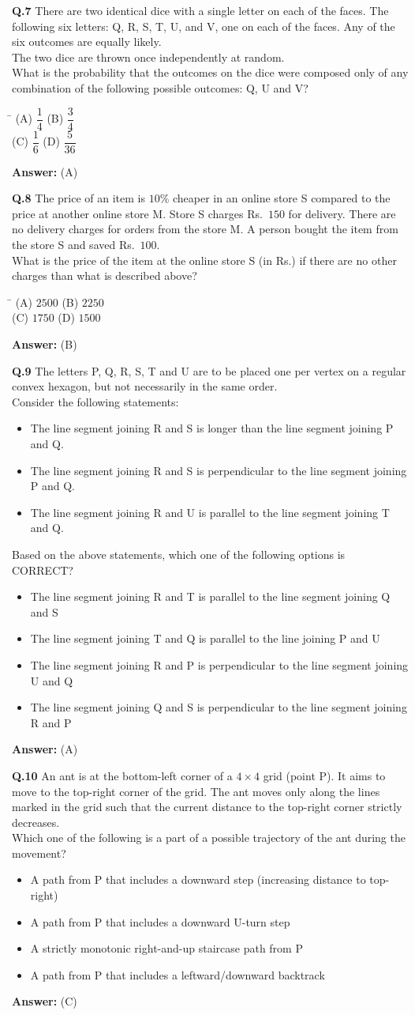 \documentclass[11pt,a4paper]{article}
\newcommand{\optsfourA}[4]{%
  \begin{tabbing}
    \hspace{0.48\linewidth}\=\kill
    (A) #1 \> (B) #2 \\[2pt]
    (C) #3 \> (D) #4
  \end{tabbing}%
}
\newcommand{\optslistA}[4]{%
  \begin{itemize}
    \setlength{\itemsep}{2pt}\setlength{\parskip}{0pt}
    \item[(A)] #1
    \item[(B)] #2
    \item[(C)] #3
    \item[(D)] #4
  \end{itemize}%
}
\newcommand{\ans}[1]{\textbf{Answer:} #1\par\medskip}
\begin{document}
\textbf{Q.7} There are two identical dice with a single letter on each of the faces. The following six letters: Q, R, S, T, U, and V, one on each of the faces. Any of the six outcomes are equally likely.\\
The two dice are thrown once independently at random.\\
What is the probability that the outcomes on the dice were composed only of any combination of the following possible outcomes: Q, U and V?
\optsfourA{$\dfrac{1}{4}$}{$\dfrac{3}{4}$}{$\dfrac{1}{6}$}{$\dfrac{5}{36}$}
\ans{(A)}

\textbf{Q.8} The price of an item is $10\%$ cheaper in an online store S compared to the price at another online store M. Store S charges Rs.~$150$ for delivery. There are no delivery charges for orders from the store M. A person bought the item from the store S and saved Rs.~$100$.\\
What is the price of the item at the online store S (in Rs.) if there are no other charges than what is described above?
\optsfourA{$2500$}{$2250$}{$1750$}{$1500$}
\ans{(B)}

\textbf{Q.9} The letters P, Q, R, S, T and U are to be placed one per vertex on a regular convex hexagon, but not necessarily in the same order.\\
Consider the following statements:
\begin{itemize}
  \setlength{\itemsep}{1pt}\setlength{\parskip}{0pt}
  \item The line segment joining R and S is longer than the line segment joining P and Q.
  \item The line segment joining R and S is perpendicular to the line segment joining P and Q.
  \item The line segment joining R and U is parallel to the line segment joining T and Q.
\end{itemize}
Based on the above statements, which one of the following options is CORRECT?
\optslistA{The line segment joining R and T is parallel to the line segment joining Q and S}{The line segment joining T and Q is parallel to the line joining P and U}{The line segment joining R and P is perpendicular to the line segment joining U and Q}{The line segment joining Q and S is perpendicular to the line segment joining R and P}
\ans{(A)}

\textbf{Q.10} An ant is at the bottom-left corner of a $4 \times 4$ grid (point P). It aims to move to the top-right corner of the grid. The ant moves only along the lines marked in the grid such that the current distance to the top-right corner strictly decreases.\\
Which one of the following is a part of a possible trajectory of the ant during the movement?
\optslistA{A path from P that includes a downward step (increasing distance to top-right)}{A path from P that includes a downward U-turn step}{A strictly monotonic right-and-up staircase path from P}{A path from P that includes a leftward/downward backtrack}
\ans{(C)}
\end{document}
